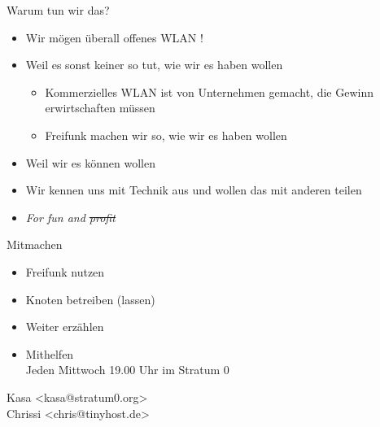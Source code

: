 \documentclass[fleqn,11pt,aspectratio=169]{beamer}
\begin{document}
\begin{frame}{Warum tun wir das?}
\begin{itemize}
	\item Wir mögen überall offenes WLAN !
	\item Weil es sonst keiner so tut, wie wir es haben wollen
	\begin{itemize}
		\item Kommerzielles WLAN ist von Unternehmen gemacht, die Gewinn erwirtschaften müssen
		\item Freifunk machen wir so, wie wir es haben wollen
	\end{itemize}
	\item Weil wir es können wollen
	\item Wir kennen uns mit Technik aus und wollen das mit anderen teilen
	\item \textit{For fun and \sout{profit}}
\end{itemize}
\end{frame}

\begin{frame}{Mitmachen}
\begin{itemize}
	\item Freifunk nutzen 
	\pause
	\item Knoten betreiben (lassen)
	\pause
	\item Weiter erzählen
	\pause
	\item Mithelfen\\
	Jeden Mittwoch 19.00 Uhr im Stratum 0
\end{itemize}
\end{frame}

\begin{finalframe}{}
Kasa <kasa@stratum0.org>\\
Chrissi <chris@tinyhost.de>\\
\end{finalframe}
\end{document}
